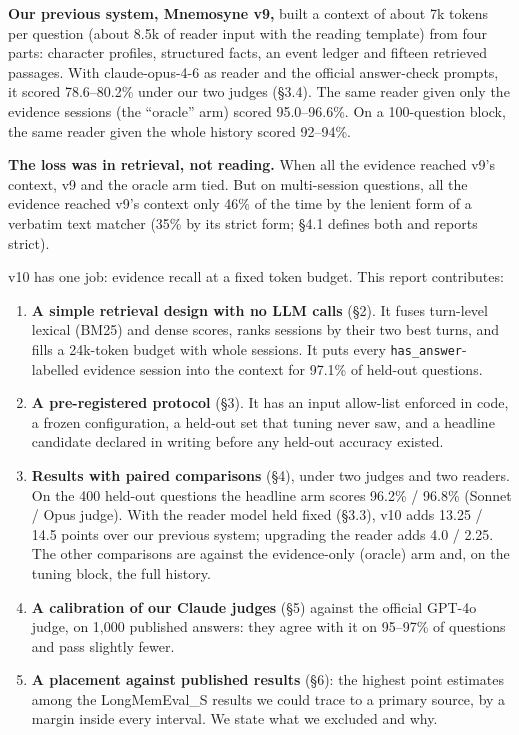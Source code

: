 \documentclass[11pt]{article}
\providecommand{\tightlist}{\setlength{\itemsep}{0pt}\setlength{\parskip}{0pt}}
\begin{document}
\textbf{Our previous system, Mnemosyne v9,} built a context of about 7k tokens per question (about 8.5k of reader input with the
reading template) from four parts: character
profiles, structured facts, an event ledger and fifteen retrieved passages. With claude-opus-4-6 as reader
and the official answer-check prompts, it scored 78.6--80.2\% under our two judges (§3.4). The same reader
given only the evidence sessions (the ``oracle'' arm) scored 95.0--96.6\%. On a 100-question block, the same
reader given the whole history scored 92--94\%.

\textbf{The loss was in retrieval, not reading.} When all the evidence reached v9's context, v9 and the oracle
arm tied. But on multi-session questions, all the evidence reached v9's context only 46\% of the time by the
lenient form of a verbatim text matcher (35\% by its strict form; §4.1 defines both and reports strict).

v10 has one job: evidence recall at a fixed token budget. This report contributes:

\begin{enumerate}
\def\labelenumi{\arabic{enumi}.}
\tightlist
\item
  \textbf{A simple retrieval design with no LLM calls} (§2). It fuses turn-level lexical (BM25) and dense
  scores, ranks sessions by their two best turns, and fills a 24k-token budget with whole sessions. It puts
  every \texttt{has\_answer}-labelled evidence session into the context for 97.1\% of held-out questions.
\item
  \textbf{A pre-registered protocol} (§3). It has an input allow-list enforced in code, a frozen configuration,
  a held-out set that tuning never saw, and a headline candidate declared in writing before any held-out
  accuracy existed.
\item
  \textbf{Results with paired comparisons} (§4), under two judges and two readers. On the 400 held-out
  questions the headline arm scores 96.2\% / 96.8\% (Sonnet / Opus judge). With the reader model held fixed
  (§3.3), v10 adds 13.25 / 14.5 points over our previous system; upgrading the reader adds 4.0 / 2.25. The
  other comparisons are against the evidence-only (oracle) arm and, on the tuning block, the full history.
\item
  \textbf{A calibration of our Claude judges} (§5) against the official GPT-4o judge, on 1,000 published
  answers: they agree with it on 95--97\% of questions and pass slightly fewer.
\item
  \textbf{A placement against published results} (§6): the highest point estimates among the LongMemEval\_S
  results we could trace to a primary source, by a margin inside every interval. We state what we
  excluded and why.
\end{enumerate}
\end{document}
